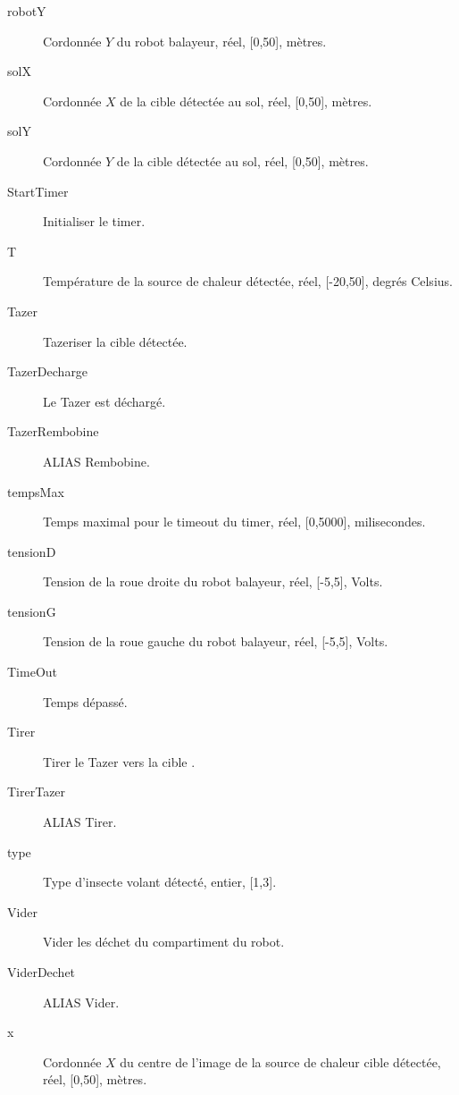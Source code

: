 \begin{description}
	\item [robotY]\el
	Cordonnée $Y$ du robot balayeur, réel, [0,50], mètres.

	\item [solX]\el
	Cordonnée $X$ de la cible détectée au sol, réel, [0,50], mètres.

	\item [solY]\el
	Cordonnée $Y$ de la cible détectée au sol, réel, [0,50], mètres.

	\item [StartTimer]\el
	Initialiser le timer.

	\item [T]\el
	Température de la source de chaleur détectée, réel, [-20,50], degrés Celsius.

	\item [Tazer]\el
	Tazeriser la cible détectée.

	\item [TazerDecharge]\el
	Le Tazer est déchargé.

	\item [TazerRembobine]\el
	ALIAS Rembobine.

	\item [tempsMax]\el
	Temps maximal pour le timeout du timer, réel, [0,5000], milisecondes.

	\item [tensionD]\el
	Tension de la roue droite du robot balayeur, réel, [-5,5], Volts.

	\item [tensionG]\el
	Tension de la roue gauche du robot balayeur, réel, [-5,5], Volts.

	\item [TimeOut]\el
	Temps dépassé.

	\item [Tirer]\el
	Tirer le Tazer vers la cible	.

	\item [TirerTazer]\el
	ALIAS Tirer.

	\item [type]\el
	Type d'insecte volant détecté, entier, [1,3].

	\item [Vider]\el
	Vider les déchet du compartiment du robot.

	\item [ViderDechet]\el
	ALIAS Vider.

	\item [x]\el
	Cordonnée $X$ du centre de l'image de la source de chaleur cible détectée, réel, [0,50], mètres.	


\end{description}
